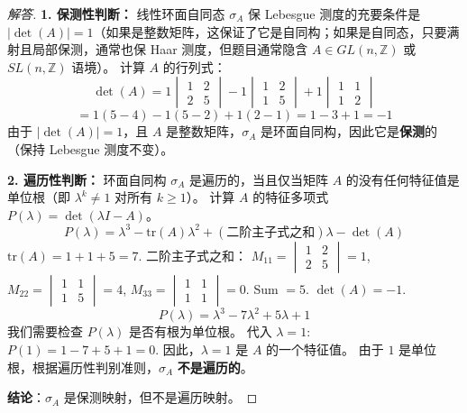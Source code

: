 \documentclass[a4paper,12pt]{article}
\newenvironment{solution}{\begin{proof}[解答]}{\end{proof}}
\begin{document}
\begin{solution}
    \textbf{1. 保测性判断：}
    线性环面自同态 $\sigma_A$ 保 Lebesgue 测度的充要条件是 $|\det(A)| = 1$（如果是整数矩阵，这保证了它是自同构；如果是自同态，只要满射且局部保测，通常也保 Haar 测度，但题目通常隐含 $A \in GL(n, \mathbb{Z})$ 或 $SL(n, \mathbb{Z})$ 语境）。
    计算 $A$ 的行列式：
    $$
    \det(A) = 1 \begin{vmatrix} 1 & 2 \\ 2 & 5 \end{vmatrix} - 1 \begin{vmatrix} 1 & 2 \\ 1 & 5 \end{vmatrix} + 1 \begin{vmatrix} 1 & 1 \\ 1 & 2 \end{vmatrix}
    $$
    $$
    = 1(5-4) - 1(5-2) + 1(2-1) = 1 - 3 + 1 = -1
    $$
    由于 $|\det(A)| = 1$，且 $A$ 是整数矩阵，$\sigma_A$ 是环面自同构，因此它是\textbf{保测}的（保持 Lebesgue 测度不变）。

    \textbf{2. 遍历性判断：}
    环面自同构 $\sigma_A$ 是遍历的，当且仅当矩阵 $A$ 的没有任何特征值是单位根（即 $\lambda^k \neq 1$ 对所有 $k \ge 1$）。
    计算 $A$ 的特征多项式 $P(\lambda) = \det(\lambda I - A)$。
    $$
    P(\lambda) = \lambda^3 - \text{tr}(A)\lambda^2 + (\text{二阶主子式之和})\lambda - \det(A)
    $$
    $\text{tr}(A) = 1 + 1 + 5 = 7$.
    二阶主子式之和：
    $M_{11} = \begin{vmatrix} 1 & 2 \\ 2 & 5 \end{vmatrix} = 1$,
    $M_{22} = \begin{vmatrix} 1 & 1 \\ 1 & 5 \end{vmatrix} = 4$,
    $M_{33} = \begin{vmatrix} 1 & 1 \\ 1 & 1 \end{vmatrix} = 0$.
    Sum $= 5$.
    $\det(A) = -1$.
    $$
    P(\lambda) = \lambda^3 - 7\lambda^2 + 5\lambda + 1
    $$
    我们需要检查 $P(\lambda)$ 是否有根为单位根。
    代入 $\lambda = 1$: $P(1) = 1 - 7 + 5 + 1 = 0$.
    因此，$\lambda = 1$ 是 $A$ 的一个特征值。
    由于 $1$ 是单位根，根据遍历性判别准则，$\sigma_A$ \textbf{不是遍历的}。

    \textbf{结论}：$\sigma_A$ 是保测映射，但不是遍历映射。
\end{solution}
\end{document}
